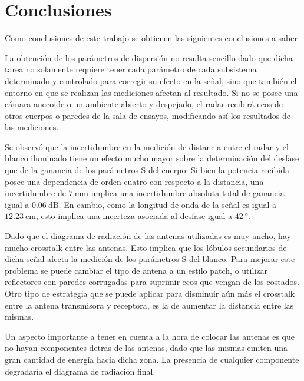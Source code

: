 \chapter{Conclusiones} \label{ch:conclusions}

\ifpdf
    \graphicspath{{Chapter6/Figs/Raster/}{Chapter6/Figs/PDF/}{Chapter6/Figs/}}
\else
    \graphicspath{{Chapter6/Figs/Vector/}{Chapter6/Figs/}}
\fi

Como conclusiones de este trabajo se obtienen las siguientes conclusiones a saber

La obtención de los parámetros de dispersión no resulta sencillo dado que dicha tarea no solamente requiere tener cada parámetro de cada subsistema determinado y controlado para corregir su efecto en la señal, sino que también el entorno en que se realizan las mediciones afectan al resultado. Si no se posee una cámara anecoide o un ambiente abierto y despejado, el radar recibirá ecos de otros cuerpos o paredes de la sala de ensayos, modificando así los resultados de las mediciones.

Se observó que la incertidumbre en la medición de distancia entre el radar y el blanco iluminado tiene un efecto mucho mayor sobre la determinación del desfase que de la ganancia de los parámetros S del cuerpo. Si bien la potencia recibida posee una dependencia de orden cuatro con respecto a la distancia, una incertidumbre de $\SI{7}{\milli\meter}$ implica una incertidumbre absoluta total de ganancia igual a $\SI{0.06}{\dB}$. En cambio, como la longitud de onda de la señal es igual a $\SI{12.23}{\centi\meter}$, esto implica una incerteza asociada al desfase igual a $\SI{42}{\degree}$.

Dado que el diagrama de radiación de las antenas utilizadas es muy ancho, hay mucho crosstalk entre las antenas. Esto implica que los lóbulos secundarios de dicha señal afecta la medición de los parámetros S del blanco. Para mejorar este problema se puede cambiar el tipo de antena a un estilo patch, o utilizar reflectores con paredes corrugadas para suprimir ecos que vengan de los costados. Otro tipo de estrategia que se puede aplicar para disminuir aún más el crosstalk entre la antena transmisora y receptora, es la de aumentar la distancia entre las mismas.

Un aspecto importante a tener en cuenta a la hora de colocar las antenas es que no hayan componentes detras de las antenas, dado que las mismas emiten una gran cantidad de energía hacia dicha zona. La presencia de cualquier componente degradaría el diagrama de radiación final.

